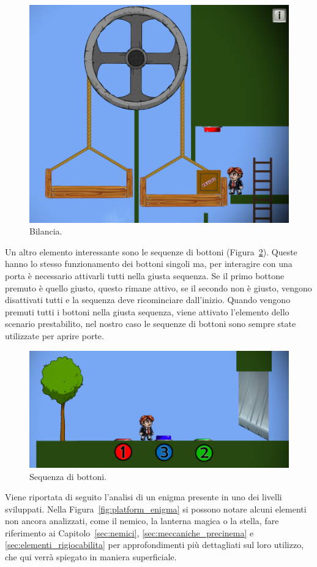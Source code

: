 \begin{figure}%
	\centering
	\includegraphics[width= 0.5\columnwidth]{images/gameDesign/11.jpg}
	\caption{Bilancia.}
	\label{fig:platform_bilancia}
\end{figure}

Un altro elemento interessante sono le sequenze di bottoni (Figura~\ref{fig:platform_sequenza_bottoni}). Queste hanno lo stesso funzionamento dei bottoni singoli ma, per interagire con una porta è necessario attivarli tutti nella giusta sequenza. Se il primo bottone premuto è quello giusto, questo rimane attivo, se il secondo non è giusto, vengono disattivati tutti e la sequenza deve ricominciare dall’inizio. Quando vengono premuti tutti i bottoni nella giusta sequenza, viene attivato l’elemento dello scenario prestabilito, nel nostro caso le sequenze di bottoni sono sempre state utilizzate per aprire porte.

\begin{figure}%
	\centering
	\includegraphics[width= 0.7\columnwidth]{images/gameDesign/12.jpg}
	\caption{Sequenza di bottoni.}
	\label{fig:platform_sequenza_bottoni}
\end{figure}

Viene riportata di seguito l’analisi di un enigma presente in uno dei livelli sviluppati. Nella Figura~\ref{fig:platform_enigma} si possono notare alcuni elementi non ancora analizzati, come il nemico, la lanterna magica o la stella, fare riferimento ai Capitolo~\ref{sec:nemici}, \ref{sec:meccaniche_precinema} e \ref{sec:elementi_rigiocabilita} per approfondimenti più dettagliati sul loro utilizzo, che qui verrà spiegato in maniera superficiale.

